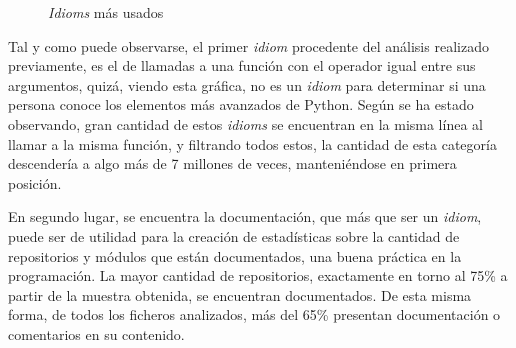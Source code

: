 \documentclass[a4paper, 12pt]{book}
\begin{document}
\begin{figure}[t]
\centering
{}
\caption{\textit{Idioms} más usados}
\label{fig:idiom_rank}
\end{figure}

Tal y como puede observarse, el primer \textit{idiom} procedente del análisis realizado previamente, es el de llamadas a una función con el operador igual entre sus argumentos, quizá, viendo esta gráfica, no es un \textit{idiom} para determinar si una persona conoce los elementos más avanzados de Python. Según se ha estado observando, gran cantidad de estos \textit{idioms} se encuentran en la misma línea al llamar a la misma función, y filtrando todos estos, la cantidad de esta categoría descendería a algo más de 7 millones de veces, manteniéndose en primera posición.

En segundo lugar, se encuentra la documentación, que más que ser un \textit{idiom}, puede ser de utilidad para la creación de estadísticas sobre la cantidad de repositorios y módulos que están documentados, una buena práctica en la programación. La mayor cantidad de repositorios, exactamente en torno al 75\% a partir de la muestra obtenida, se encuentran documentados. De esta misma forma, de todos los ficheros analizados, más del 65\% presentan documentación o comentarios en su contenido.
\end{document}
